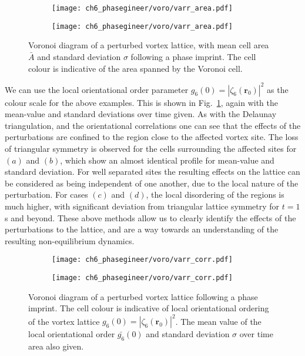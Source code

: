 \begin{figure}\ContinuedFloat\centering
    \begin{subfigure}{0.6\textwidth}
        \texttt{[image: ch6\_phasegineer/voro/varr\_area.pdf]}
    \end{subfigure}
    \begin{subfigure}{0.6\textwidth}
        \texttt{[image: ch6\_phasegineer/voro/varr\_area.pdf]}
    \end{subfigure}
    \caption{Voronoi diagram of a perturbed vortex lattice, with mean cell area $\bar{A}$ and standard deviation $\sigma$ following a phase imprint. The cell colour is indicative of the area spanned by the Voronoi cell.}
\end{figure}

We can use the local orientational order parameter $g_6(0) = |\zeta_6(\mathbf{r}_0)|^2$ as the colour scale for the above examples. This is shown in Fig.~\ref{fig:voronoiscorr}, again with the mean-value and standard deviations over time given. As with the Delaunay triangulation, and the orientational correlations one can see that the effects of the perturbations are confined to the region close to the affected vortex site. The loss of triangular symmetry is observed for the cells surrounding the affected sites for $(a)$ and $(b)$, which show an almost identical profile for mean-value and standard deviation. For well separated sites the resulting effects on the lattice can be considered as being independent of one another, due to the local nature of the perturbation. For cases $(c)$ and $(d)$, the local disordering of the regions is much higher, with significant deviation from triangular lattice symmetry for $t=1$ s and beyond. These above methods allow us to clearly identify the effects of the perturbations to the lattice, and are a way towards an understanding of the resulting non-equilibrium dynamics.

\begin{figure}\centering
    \begin{subfigure}{0.6\textwidth}
        \texttt{[image: ch6\_phasegineer/voro/varr\_corr.pdf]}
    \end{subfigure}
    \begin{subfigure}{0.6\textwidth}
        \texttt{[image: ch6\_phasegineer/voro/varr\_corr.pdf]}
    \end{subfigure}
    \caption{Voronoi diagram of a perturbed vortex lattice following a phase imprint. The cell colour is indicative of local orientational ordering of the vortex lattice $g_6(0) = |\zeta_6(\mathbf{r}_0)|^2$. The mean value of the local orientational order $\bar{g_6}(0)$ and standard deviation $\sigma$ over time area also given.}\label{fig:voronoiscorr}
\end{figure}


